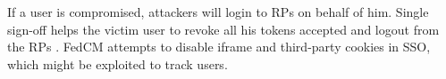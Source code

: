 If a user is compromised,
    attackers will login to RPs on behalf of him.
Single sign-off helps the victim user
 to revoke all his tokens accepted and logout from the RPs  \cite{GhasemisharifRC18}.
FedCM \cite{FedCM} attempts to disable iframe and third-party cookies in SSO, which might be exploited to track users.



